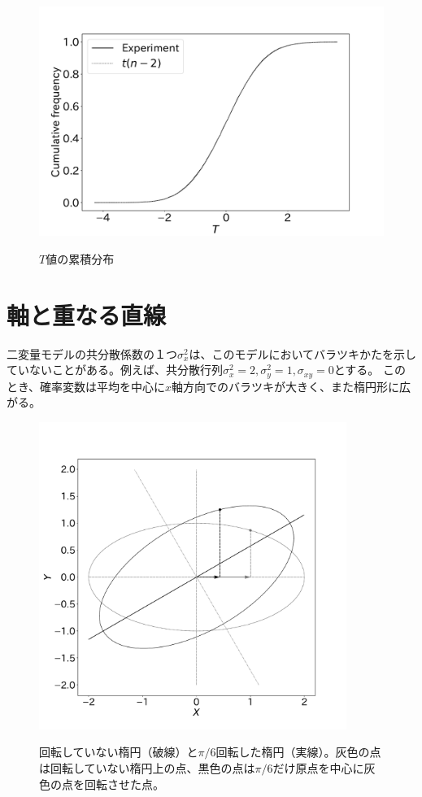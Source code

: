 \begin{figure}
 \begin{center}
  \includegraphics[width=15cm]{./image/16_/Correlation_null_model.pdf}
  \label{fig:Correlation_null_model}
  \caption{$T$値の累積分布}
 \end{center}
\end{figure}







\section{軸と重なる直線}
二変量モデルの共分散係数の１つ$\sigma_x^2$は、このモデルにおいてバラツキかたを示していないことがある。例えば、共分散行列$\sigma_x^2=2,\sigma_y^2=1,\sigma_{xy}=0$とする。
このとき、確率変数は平均を中心に$x$軸方向でのバラツキが大きく、また楕円形に広がる。

\begin{figure}
 \begin{center}
  \includegraphics[width=10cm]{./image/16_/ellipse_x_axis_twice_angle_pi_6.pdf}
  \label{fig:ellipse_x_axis_twice_angle_pi_6}
  \caption{回転していない楕円（破線）と$\pi/6$回転した楕円（実線）。灰色の点は回転していない楕円上の点、黒色の点は$\pi/6$だけ原点を中心に灰色の点を回転させた点。}
 \end{center}
\end{figure}

